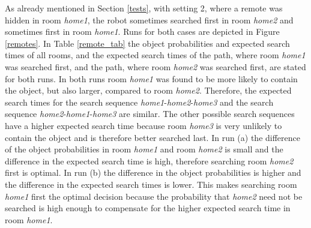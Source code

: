 As already mentioned in Section \ref{tests}, with setting 2, where a remote was hidden in room \textit{home1}, the robot sometimes searched first in room \textit{home2} and sometimes first in room \textit{home1}. Runs for both cases are depicted in Figure \ref{remotes}. In Table \ref{remote_tab} the object probabilities and expected search times of all rooms, and the expected search times of the path, where room \textit{home1} was searched first, and the path, where room \textit{home2} was searched first, are stated for both runs. In both runs room \textit{home1} was found to be more likely to contain the object, but also larger, compared to room \textit{home2}. Therefore, the expected search times for the search sequence \textit{home1}-\textit{home2}-\textit{home3} and the search sequence \textit{home2}-\textit{home1}-\textit{home3} are similar. The other possible search sequences have a higher expected search time because room \textit{home3} is very unlikely to contain the object and is therefore better searched last. In run (a) the difference of the object probabilities in room \textit{home1} and room \textit{home2} is small and the difference in the expected search time is high, therefore searching room \textit{home2} first is optimal. In run (b) the difference in the object probabilities is higher and the difference in the expected search times is lower. This makes searching room \textit{home1} first the optimal decision because the probability that \textit{home2} need not be searched is high enough to compensate for the higher expected search time in room \textit{home1}.


